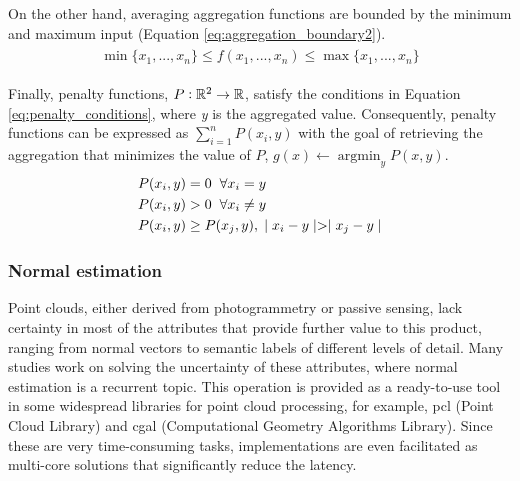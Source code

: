 On the other hand, averaging aggregation functions are bounded by the minimum and maximum input (Equation \ref{eq:aggregation_boundary2}).
\begin{gather}
    \label{eq:aggregation_boundary2}
    \begin{aligned}
        \min{\{x_1,...,x_n\}} \leq f(x_1,...,x_n) \leq \max{\{x_1,...,x_n\}}
    \end{aligned}
\end{gather}

Finally, penalty functions, $P: \mathbb{R}^{2} \rightarrow \mathbb{R}$, satisfy the conditions in Equation \ref{eq:penalty_conditions}, where \textit{y} is the aggregated value. Consequently, penalty functions can be expressed as $\sum_{i=1}^{n} P(x_i, y)$ with the goal of retrieving the aggregation that minimizes the value of $P$, $g(x) \gets \operatorname*{argmin}_y P(x, y)$.
\begin{gather}
    \label{eq:penalty_conditions}
    \begin{aligned}
        &P(x_i,y) = 0 \hspace{2mm} \forall x_i = y\\
        &P(x_i,y) > 0 \hspace{2mm} \forall x_i \neq y\\
        &P(x_i,y) \ge P(x_j,y), \hspace{1mm}\mid x_i - y \mid > \mid x_j - y \mid\\
    \end{aligned}
\end{gather}

\subsubsection{Normal estimation}

Point clouds, either derived from photogrammetry or passive sensing, lack certainty in most of the attributes that provide further value to this product, ranging from normal vectors to semantic labels of different levels of detail. Many studies work on solving the uncertainty of these attributes, where normal estimation is a recurrent topic. This operation is provided as a ready-to-use tool in some widespread libraries for point cloud processing, for example, \acrshort{pcl} (Point Cloud Library) and \acrshort{cgal} (Computational Geometry Algorithms Library). Since these are very time-consuming tasks, implementations are even facilitated as multi-core solutions that significantly reduce the latency. 

